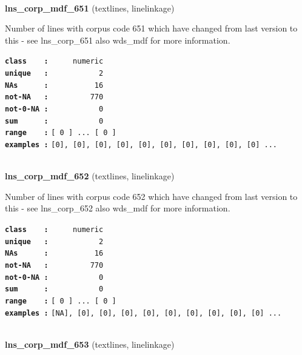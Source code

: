 \documentclass[]{article}
\begin{document}
~

\textbf{lns\_corp\_mdf\_651} (textlines, linelinkage)

Number of lines with corpus code 651 which have changed from last
version to this - see lns\_corp\_651 also wds\_mdf for more information.

\textbf{\texttt{class\ \ \ \ :}} \texttt{~~~~~numeric}\\
\textbf{\texttt{unique\ \ \ :}} \texttt{~~~~~~~~~~~2}\\
\textbf{\texttt{NAs\ \ \ \ \ \ :}} \texttt{~~~~~~~~~~16}\\
\textbf{\texttt{not-NA\ \ \ :}} \texttt{~~~~~~~~~770}\\
\textbf{\texttt{not-0-NA\ :}} \texttt{~~~~~~~~~~~0}\\
\textbf{\texttt{sum\ \ \ \ \ \ :}} \texttt{~~~~~~~~~~~0}\\
\textbf{\texttt{range\ \ \ \ :}}
\texttt{{[}\ 0\ {]}\ ...\ {[}\ 0\ {]}}\\
\textbf{\texttt{examples\ :}}
\texttt{{[}0{]},\ {[}0{]},\ {[}0{]},\ {[}0{]},\ {[}0{]},\ {[}0{]},\ {[}0{]},\ {[}0{]},\ {[}0{]},\ {[}0{]}\ ...}\\

~

\textbf{lns\_corp\_mdf\_652} (textlines, linelinkage)

Number of lines with corpus code 652 which have changed from last
version to this - see lns\_corp\_652 also wds\_mdf for more information.

\textbf{\texttt{class\ \ \ \ :}} \texttt{~~~~~numeric}\\
\textbf{\texttt{unique\ \ \ :}} \texttt{~~~~~~~~~~~2}\\
\textbf{\texttt{NAs\ \ \ \ \ \ :}} \texttt{~~~~~~~~~~16}\\
\textbf{\texttt{not-NA\ \ \ :}} \texttt{~~~~~~~~~770}\\
\textbf{\texttt{not-0-NA\ :}} \texttt{~~~~~~~~~~~0}\\
\textbf{\texttt{sum\ \ \ \ \ \ :}} \texttt{~~~~~~~~~~~0}\\
\textbf{\texttt{range\ \ \ \ :}}
\texttt{{[}\ 0\ {]}\ ...\ {[}\ 0\ {]}}\\
\textbf{\texttt{examples\ :}}
\texttt{{[}NA{]},\ {[}0{]},\ {[}0{]},\ {[}0{]},\ {[}0{]},\ {[}0{]},\ {[}0{]},\ {[}0{]},\ {[}0{]},\ {[}0{]}\ ...}\\

~

\textbf{lns\_corp\_mdf\_653} (textlines, linelinkage)
\end{document}
